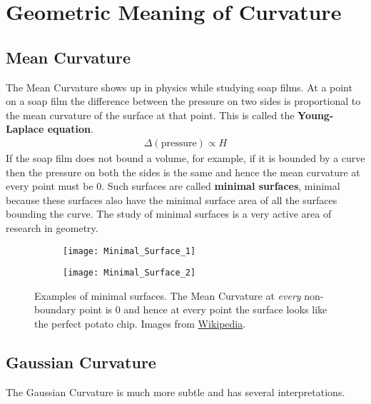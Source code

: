 
\section{Geometric Meaning of Curvature}

\subsection{Mean Curvature}
  The Mean Curvature shows up in physics while studying soap films. At a point on a soap film the difference between the pressure on two sides is proportional to the mean curvature of the surface at that point. This is called the \textbf{Young-Laplace equation}.
  \begin{align*}
    \Delta (\mbox{pressure}) \propto H
  \end{align*}
  If the soap film does not bound a volume, for example, if it is bounded by a curve then the pressure on both the sides is the same and hence the mean curvature at every point must be 0. Such surfaces are called \textbf{minimal surfaces}, minimal because these surfaces also have the minimal surface area of all the surfaces bounding the curve. The study of minimal surfaces is a very active area of research in geometry.
  \begin{figure}[H]
    \centering
    \begin{subfigure}[t]{0.495\textwidth}
      \centering
      \texttt{[image: Minimal\_Surface\_1]}
    \end{subfigure}
    \begin{subfigure}[t]{0.495\textwidth}
      \centering
      \texttt{[image: Minimal\_Surface\_2]}
    \end{subfigure}
    \caption{Examples of minimal surfaces. The Mean Curvature at \emph{every} non-boundary point is 0 and hence at every point the surface looks like the perfect potato chip. Images from \href{https://en.wikipedia.org/wiki/Minimal_surface}{Wikipedia}.}
  \end{figure}

\subsection{Gaussian Curvature}
  The Gaussian Curvature is much more subtle and has several interpretations.

